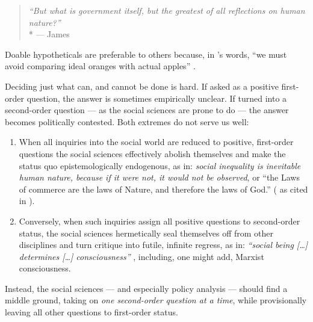 
\begin{quote}
	\emph{``But what is government itself, but the greatest of all reflections on human nature?''}
	\\*
	--- James \citet[143]{Madison1788}
\end{quote}

Doable hypotheticals are preferable to others because, in \citeauthor{Dahl-1989-aa}'s words, ``we must avoid comparing ideal oranges with actual apples'' \citeyearpar[84]{Dahl-1989-aa}.

Deciding just what can, and cannot be done is hard.
If asked as a positive first-order question, the answer is sometimes empirically unclear.
If turned into a second-order question --- as the social sciences are prone to do --- the answer becomes politically contested.
Both extremes do not serve us well:
\begin{enumerate}
	\item
	When all inquiries into the social world are reduced to positive, first-order questions the social sciences effectively abolish themselves and make the status quo epistemologically endogenous, as in:
	\emph{social inequality is inevitable human nature, because if it were not, it would not be observed}, or ``the Laws of commerce are the laws of Nature, and therefore the laws of God.'' (\citeauthor{Burke1790} as cited in \citealt[834]{Marx-1867-aa}).%

	\item
	Conversely, when such inquiries assign all positive questions to second-order status, the social sciences hermetically seal themselves off from other disciplines and turn critique into futile, infinite regress, as in:
	\emph{``social being [\ldots] determines [\ldots] consciousness''} \citep[Preface]{Marx1859}, including, one might add, Marxist consciousness.
\end{enumerate}

Instead, the social sciences --- and especially policy analysis --- should find a middle ground, taking on \emph{one second-order question at a time}, while provisionally leaving all other questions to first-order status.

